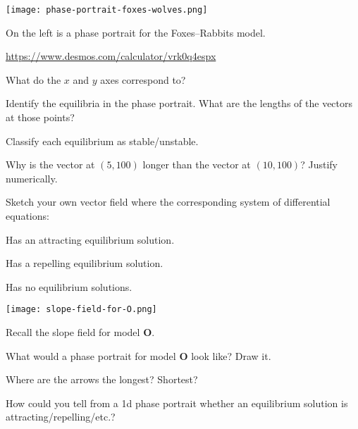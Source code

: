 \documentclass{workbook}
\begin{document}
\begin{slide}

	\question
	
	\begin{center}
		\texttt{[image: phase-portrait-foxes-wolves.png]}
	\end{center}



	On the left is a phase portrait for the Foxes--Rabbits model.

	\url{https://www.desmos.com/calculator/vrk0q4espx}

	\begin{parts}
		\item What do the $x$ and $y$ axes correspond to?
		\item Identify the equilibria in the phase portrait. What are the lengths of the vectors at those points?
		\item Classify each equilibrium as stable/unstable.
		\item Why is the vector at $(5,100)$ longer than the vector at $(10,100)$? Justify numerically.
	\end{parts}
\end{slide}

\begin{slide}

	\question
	Sketch your own vector field where the corresponding system of differential equations:

	\begin{parts}
		\item Has an attracting equilibrium solution.
		\item Has a repelling equilibrium solution.
		\item Has no equilibrium solutions.
	\end{parts}
\end{slide}

\begin{slide}

	\question
	
	\begin{center}
	\texttt{[image: slope-field-for-O.png]}
	\end{center}

	Recall the slope field for model \textbf{O}.

	\begin{parts}
		\item What would a phase portrait for model \textbf{O} look like? Draw it.
		\item Where are the arrows the longest? Shortest?
		\item How could you tell from a 1d phase portrait whether an equilibrium solution is
		attracting/repelling/etc.?
	\end{parts}
\end{slide}
\end{document}
